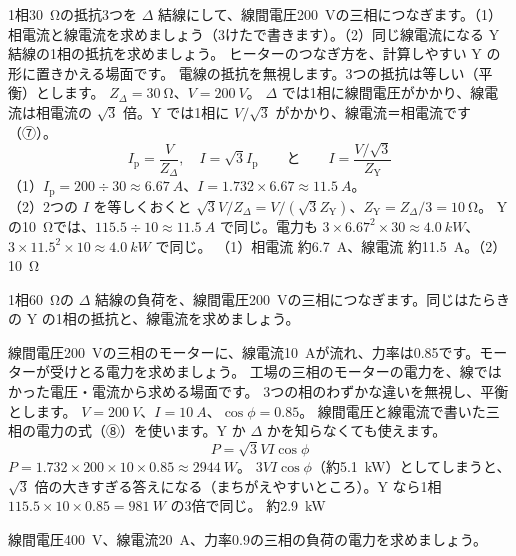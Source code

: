 \label{ph:電-11:ex9}
\begin{phreidai}
1相\qty{30}{\ohm}の抵抗3つを $\Delta$ 結線にして、線間電圧\qty{200}{V}の三相につなぎます。（1）相電流と線電流を求めましょう（3けたで書きます）。（2）同じ線電流になる Y 結線の1相の抵抗を求めましょう。
\phbamen
ヒーターのつなぎ方を、計算しやすい Y の形に置きかえる場面です。
\phmushi
電線の抵抗を無視します。3つの抵抗は等しい（平衡）とします。
\phzu
$Z_\Delta=\qty{30}{\ohm}$、$V=\qty{200}{V}$。
\phriyu
$\Delta$ では1相に線間電圧がかかり、線電流は相電流の $\sqrt3$ 倍。Y では1相に $V/\sqrt3$ がかかり、線電流＝相電流です（⑦）。
\phtateru
\[I_{\mathrm p}=\frac{V}{Z_\Delta},\quad I=\sqrt3I_{\mathrm p}\qquad\text{と}\qquad I=\frac{V/\sqrt3}{Z_{\mathrm Y}}\]
\phtoku
（1）$I_{\mathrm p}=200\div30\approx\qty{6.67}{A}$、$I=1.732\times6.67\approx\qty{11.5}{A}$。\\
（2）2つの $I$ を等しくおくと $\sqrt3V/Z_\Delta=V/(\sqrt3Z_{\mathrm Y})$、$Z_{\mathrm Y}=Z_\Delta/3=\qty{10}{\ohm}$。
\phtashikame
Y の\qty{10}{\ohm}では、$115.5\div10\approx\qty{11.5}{A}$ で同じ。電力も $3\times6.67^2\times30\approx\qty{4.0}{kW}$、$3\times11.5^2\times10\approx\qty{4.0}{kW}$ で同じ。
\kotae （1）相電流 約\qty{6.7}{A}、線電流 約\qty{11.5}{A}。（2）\qty{10}{\ohm}
\end{phreidai}
\begin{jibun}
1相\qty{60}{\ohm}の $\Delta$ 結線の負荷を、線間電圧\qty{200}{V}の三相につなぎます。同じはたらきの Y の1相の抵抗と、線電流を求めましょう。
\end{jibun}

\label{ph:電-11:ex10}
\begin{phreidai}[三相のモーターの電力]
線間電圧\qty{200}{V}の三相のモーターに、線電流\qty{10}{A}が流れ、力率は0.85です。モーターが受けとる電力を求めましょう。
\phbamen
工場の三相のモーターの電力を、線ではかった電圧・電流から求める場面です。
\phmushi
3つの相のわずかな違いを無視し、平衡とします。
\phzu
$V=\qty{200}{V}$、$I=\qty{10}{A}$、$\cos\phi=0.85$。
\phriyu
線間電圧と線電流で書いた三相の電力の式（⑧）を使います。Y か $\Delta$ かを知らなくても使えます。
\phtateru
\[P=\sqrt3VI\cos\phi\]
\phtoku
$P=1.732\times200\times10\times0.85\approx\qty{2944}{W}$。
\phtashikame
$3VI\cos\phi$（約\qty{5.1}{kW}）としてしまうと、$\sqrt3$ 倍の大きすぎる答えになる（まちがえやすいところ）。Y なら1相 $115.5\times10\times0.85=\qty{981}{W}$ の3倍で同じ。
\kotae 約\qty{2.9}{kW}
\end{phreidai}
\begin{jibun}
線間電圧\qty{400}{V}、線電流\qty{20}{A}、力率0.9の三相の負荷の電力を求めましょう。
\end{jibun}

